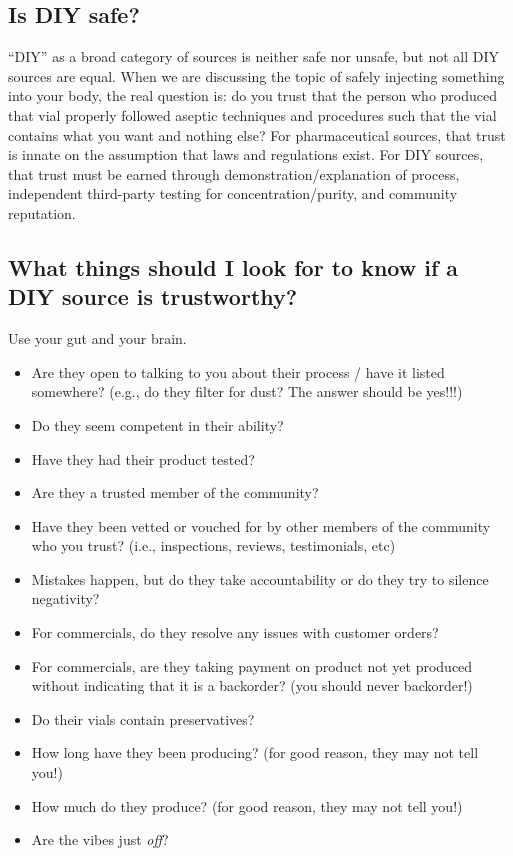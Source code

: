 \documentclass{article}
\begin{document}
\subsection{Is DIY safe?}

“DIY” as a broad category of sources is neither safe nor unsafe, but not all DIY sources are equal. When we are discussing the topic of safely injecting something into your body, the real question is: do you trust that the person who produced that vial properly followed aseptic techniques and procedures such that the vial contains what you want and nothing else? For pharmaceutical sources, that trust is innate on the assumption that laws and regulations exist. For DIY sources, that trust must be earned through demonstration/explanation of process, independent third-party testing for concentration/purity, and community reputation.

\subsection{What things should I look for to know if a DIY source is trustworthy?}

Use your gut and your brain.

\begin{itemize}
  \item Are they open to talking to you about their process / have it listed somewhere? (e.g., do they filter for dust? The answer should be yes!!!)
  \item Do they seem competent in their ability?
  \item Have they had their product tested?
  \item Are they a trusted member of the community?
  \item Have they been vetted or vouched for by other members of the community who you trust? (i.e., inspections, reviews, testimonials, etc)
  \item Mistakes happen, but do they take accountability or do they try to silence negativity?
  \item For commercials, do they resolve any issues with customer orders?
  \item For commercials, are they taking payment on product not yet produced without indicating that it is a backorder? (you should never backorder!)
  \item Do their vials contain preservatives?
  \item How long have they been producing? (for good reason, they may not tell you!)
  \item How much do they produce? (for good reason, they may not tell you!)
  \item Are the vibes just \textit{off}?
\end{itemize}
\end{document}

